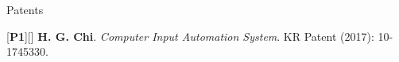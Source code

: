 \begin{cventries}

\cvpub
{Patents}{
\begin{cvitems}
\item {[\textbf{P1}][\href{https://docs.google.com/viewer?url=https://github.com/stnoah1/CV/raw/master/documents/patent.pdf}{}] \textbf{H. G. Chi}.  \textit{Computer Input Automation System}. KR Patent (2017): 10-1745330.}
\end{cvitems}
}



\end{cventries}
